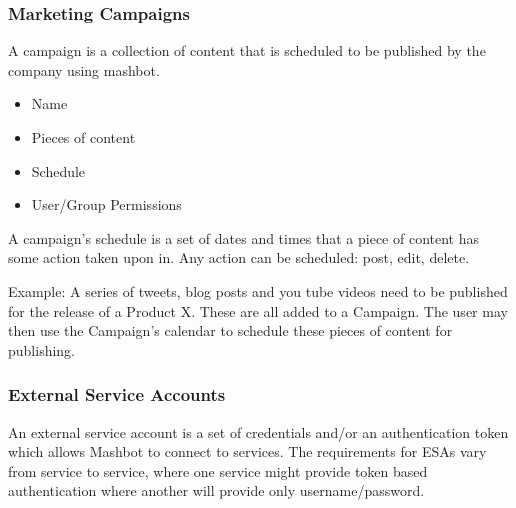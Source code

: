 \documentclass{report}
\begin{document}
		\subsubsection{Marketing Campaigns} %
				A campaign is a collection of content that is scheduled to be 
				published by the company using mashbot.
                \begin{itemize}
                  \item Name
                  \item Pieces of content
                  \item Schedule
                  \item User/Group Permissions
                \end{itemize}
				A campaign's schedule is a set of dates and times that a piece 
				of content has some action taken upon in.  Any action can be 
				scheduled: post, edit, delete.
                
				Example: A series of tweets, blog posts and you tube videos 
		need to be published for the release of a Product X.  These are all 
		added to a Campaign.  The user may then use the Campaign's calendar to 
		schedule these pieces of content for publishing.
		\subsubsection{External Service Accounts} %
                An external service account is a set of credentials
                and/or an authentication token which allows Mashbot to
                connect to services.  The requirements for ESAs vary
                from service to service, where one service might
                provide token based authentication where another will
                provide only username/password.
\end{document}
